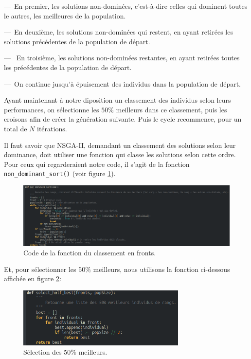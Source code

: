 \documentclass[11pt, a4paper, oneside, portrait]{report}
\begin{document}
        ---~En premier, les solutions non-dominées, c'est-à-dire celles qui dominent toutes le autres, les meilleures de la population.

        ---~En deuxième, les solutions non-dominées qui restent, en ayant retirées les solutions précédentes de la population de départ.

        ---~ En troisième, les solutions non-dominées restantes, en ayant retirées toutes les précédentes de la population de départ.

        ---~On continue jusqu'à épuisement des individus dans la population de départ.

        Ayant maintenant à notre diposition un classement des individus selon leurs performances, on sélectionne les $50\%{}$ meilleurs dans ce classement, puis les croisons afin de créer la génération suivante.
        Puis le cycle recommence, pour un total de $N$ itérations.

        Il faut savoir que NSGA-II, demandant un classement des solutions selon leur dominance, doit utiliser une fonction qui classe les solutions selon cette ordre. Pour ceux qui regarderaient notre code, il s'agit de la fonction \texttt{non\_dominant\_sort()} (voir figure \ref{fig:non_dominant_sort}).

        \begin{figure}[H]
            \centering
            \includegraphics[width=\textwidth]{Figures/non_dominant_sort.png}
            \caption{Code de la fonction du classement en fronts.}
            \label{fig:non_dominant_sort}
        \end{figure}

        Et, pour sélectionner les $50\%{}$ meilleurs, nous utilisons la fonction ci-dessous affichée en figure \ref{fig:select_half_best}:

        \begin{figure}[H]
            \centering
            \includegraphics[width=0.75\textwidth]{Figures/select_half_best.png}
            \caption{Sélection des $50\%{}$ meilleurs.}
            \label{fig:select_half_best}
        \end{figure}
\end{document}
